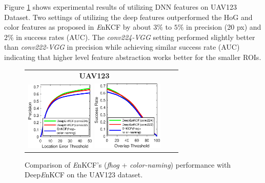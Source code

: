 \documentclass[10pt,twocolumn,letterpaper]{article}
\begin{document}
Figure \ref{fig:UAV123_DATASET_DeepFeatures} shows experimental
results of utilizing DNN features on UAV123 Dataset. Two settings of utilizing the deep
features outperformed the HoG and color features as proposed in {\it
  E}nKCF by about $3\%$ to $5\%$ in precision (20 px) and $2\%$ in
success rates (AUC). The \textit{conv224-VGG} setting performed
slightly better than \textit{conv222-VGG} in precision while achieving
similar success rate (AUC) indicating that higher level feature abstraction
works better for the smaller ROIs.
\begin{figure}[!h]
\centering
\begin{tabular}{ccc}
\tiny\quad\quad\textbf{UAV123}\\
\includegraphics[width=3.30cm]{./figures/pr_deep.eps}
\includegraphics[width=3.40cm]{./figures/sr_deep.eps}\\
\end{tabular}
\caption{Comparison of {\it E}nKCF's ({\it fhog} + {\it color-naming}) performance with Deep{\it E}nKCF on the UAV123
dataset.}
\label{fig:UAV123_DATASET_DeepFeatures}
\end{figure}

\end{document}
